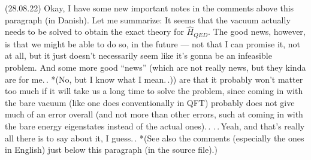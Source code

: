 \documentclass{report}
\begin{document}
{	%
	
	(28.08.22) Okay, I have some new important notes in the comments above this paragraph (in Danish). Let me summarize: It seems that the vacuum actually needs to be solved to obtain the exact theory for $\hat H_{QED}$. The good news, however, is that we might be able to do so, in the future --- not that I can promise it, not at all, but it just doesn't necessarily seem like it's gonna be an infeasible problem. And some more good ``news'' (which are not really news, but they kinda are for me.\,. *(No, but I know what I mean.\,.)) are that it probably won't matter too much if it will take us a long time to solve the problem, since coming in with the bare vacuum (like one does conventionally in QFT) probably does not give much of an error overall (and not more than other errors, such at coming in with the bare energy eigenstates instead of the actual ones).\,. .\,.\,Yeah, and that's really all there is to say about it, I guess.\,. %
	*(See also the comments (especially the ones in English) just below this paragraph (in the source file).) %
	
}
\end{document}
